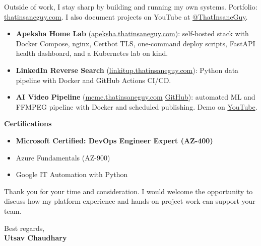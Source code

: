 \documentclass[10pt, letterpaper]{article}
\begin{document}
Outside of work, I stay sharp by building and running my own systems. Portfolio: \href{https://thatinsaneguy28.netlify.app/}{thatinsaneguy.com}. I also document projects on YouTube at \href{https://www.youtube.com/@ThatInsaneGuy}{@ThatInsaneGuy}.

\begin{itemize}
    \item \textbf{Apeksha Home Lab} (\href{https://apeksha.thatinsaneguy.com/}{apeksha.thatinsaneguy.com}): self-hosted stack with Docker Compose, nginx, Certbot TLS, one-command deploy scripts, FastAPI health dashboard, and a Kubernetes lab on kind.
    \item \textbf{LinkedIn Reverse Search} (\href{https://linkitup.thatinsaneguy.com/}{linkitup.thatinsaneguy.com}): Python data pipeline with Docker and GitHub Actions CI/CD.
    \item \textbf{AI Video Pipeline} (\href{https://meme.thatinsaneguy.com/}{meme.thatinsaneguy.com} \textbar{} \href{https://github.com/UttU28/MemeMaker/}{GitHub}): automated ML and FFMPEG pipeline with Docker and scheduled publishing. Demo on \href{https://www.youtube.com/@ThatInsaneGuy}{YouTube}.
\end{itemize}

\textbf{Certifications}
\begin{itemize}
    \item \textbf{Microsoft Certified: DevOps Engineer Expert (AZ-400)}
    \item Azure Fundamentals (AZ-900)
    \item Google IT Automation with Python
\end{itemize}

Thank you for your time and consideration. I would welcome the opportunity to discuss how my platform experience and hands-on project work can support your team.

\vspace{0.4cm}

Best regards,\\
\textbf{Utsav Chaudhary}
\end{document}
